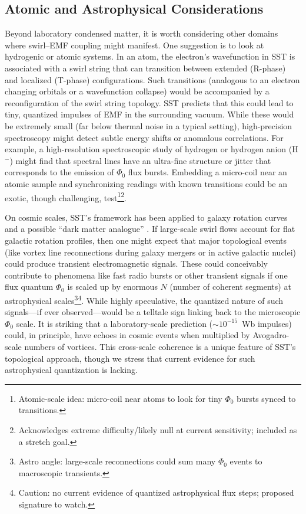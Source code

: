 \documentclass[12pt]{article}
\begin{document}
\subsection{Atomic and Astrophysical Considerations}

Beyond laboratory condensed matter, it is worth considering other domains where swirl–EMF coupling might manifest. One suggestion \cite{Iskandarani2025FluxComp} is to look at hydrogenic or atomic systems. In an atom, the electron’s wavefunction in SST is associated with a swirl string that can transition between extended (R-phase) and localized (T-phase) configurations. Such transitions (analogous to an electron changing orbitals or a wavefunction collapse) would be accompanied by a reconfiguration of the swirl string topology. SST predicts that this could lead to tiny, quantized impulses of EMF in the surrounding vacuum. While these would be extremely small (far below thermal noise in a typical setting), high-precision spectroscopy might detect subtle energy shifts or anomalous correlations. For example, a high-resolution spectroscopic study of hydrogen or hydrogen anion (H$^{-}$) might find that spectral lines have an ultra-fine structure or jitter that corresponds to the emission of $\Phi_{0}$ flux bursts. Embedding a micro-coil near an atomic sample and synchronizing readings with known transitions could be an exotic, though challenging, test\footnote{Atomic-scale idea: micro-coil near atoms to look for tiny $\Phi_0$ bursts synced to transitions.}\footnote{Acknowledges extreme difficulty/likely null at current sensitivity; included as a stretch goal.}.


On cosmic scales, SST’s framework has been applied to galaxy rotation curves and a possible ``dark matter analogue'' \cite{Iskandarani2025RotatingFrame}. If large-scale swirl flows account for flat galactic rotation profiles, then one might expect that major topological events (like vortex line reconnections during galaxy mergers or in active galactic nuclei) could produce transient electromagnetic signals. These could conceivably contribute to phenomena like fast radio bursts or other transient signals if one flux quantum $\Phi_{0}$ is scaled up by enormous $N$ (number of coherent segments) at astrophysical scales\footnote{Astro angle: large-scale reconnections could sum many $\Phi_0$ events to macroscopic transients.}\footnote{Caution: no current evidence of quantized astrophysical flux steps; proposed signature to watch.}. While highly speculative, the quantized nature of such signals—if ever observed—would be a telltale sign linking back to the microscopic $\Phi_{0}$ scale. It is striking that a laboratory-scale prediction ($\sim10^{-15}$~Wb impulses) could, in principle, have echoes in cosmic events when multiplied by Avogadro-scale numbers of vortices. This cross-scale coherence is a unique feature of SST’s topological approach, though we stress that current evidence for such astrophysical quantization is lacking.
\end{document}
